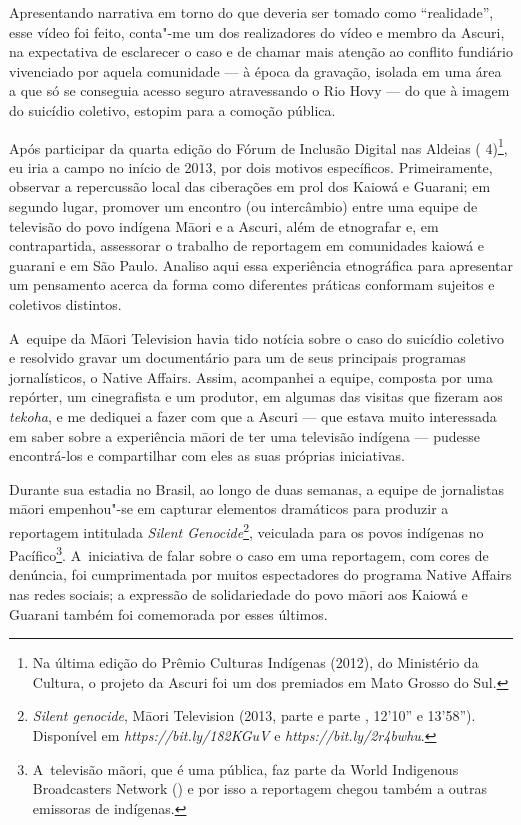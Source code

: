 Apresentando narrativa em torno do que deveria ser tomado como
``realidade'', esse vídeo foi feito, conta"-me um dos realizadores do
vídeo e membro da Ascuri, na expectativa de esclarecer o caso e de
chamar mais atenção ao conflito fundiário vivenciado por aquela
comunidade --- à época da gravação, isolada em uma área a que só se
conseguia acesso seguro atravessando o Rio Hovy --- do que à imagem do
suicídio coletivo, estopim para a comoção pública.

Após participar da quarta edição do Fórum de Inclusão Digital nas
Aldeias ( 4)\footnote{Na última edição do Prêmio Culturas Indígenas
(2012), do Ministério da Cultura, o projeto da Ascuri foi um dos
premiados em Mato Grosso do Sul.}, eu iria a campo no início de 2013,
por dois motivos específicos. Primeiramente, observar a repercussão
local das ciberações em prol dos Kaiowá e Guarani; em segundo lugar,
promover um encontro (ou intercâmbio) entre uma equipe de televisão do
povo indígena M\=aori e a Ascuri, além de etnografar e, em
contrapartida, assessorar o trabalho de reportagem em comunidades
kaiowá e guarani e em São Paulo. Analiso aqui essa experiência
etnográfica para apresentar um pensamento acerca da forma como
diferentes práticas conformam sujeitos e coletivos distintos.

A~equipe da M\=aori Television havia tido notícia sobre o caso do
suicídio coletivo e resolvido gravar um documentário para um de seus
principais programas jornalísticos, o Native Affairs. Assim, acompanhei
a equipe, composta por uma repórter, um cinegrafista e um produtor, em
algumas das visitas que fizeram aos \emph{tekoha}, e me dediquei a fazer com
que a Ascuri --- que estava muito interessada em saber sobre a
experiência m\=aori de ter uma televisão indígena --- pudesse
encontrá-los e compartilhar com eles as suas próprias iniciativas.

Durante sua estadia no Brasil, ao longo de duas semanas, a equipe de
jornalistas m\=aori empenhou"-se em capturar elementos dramáticos para
produzir a reportagem intitulada \emph{Silent Genocide}\footnote{\emph{Silent
genocide}, M\=aori Television (2013, parte  e parte ,
12'10'' e 13'58''). Disponível em
\emph{https://bit.ly/182KGuV} e \emph{https://bit.ly/2r4bwhu}.},
veiculada para os povos indígenas no Pacífico\footnote{A~televisão
mãori, que é uma  pública, faz parte da World Indigenous Broadcasters
Network () e por isso a reportagem chegou também a outras
emissoras de  indígenas. }. A~iniciativa de falar sobre o caso em uma
reportagem, com cores de denúncia, foi cumprimentada por muitos
espectadores do programa Native Affairs nas redes sociais; a expressão
de solidariedade do povo m\=aori aos Kaiowá e Guarani também foi
comemorada por esses últimos.

